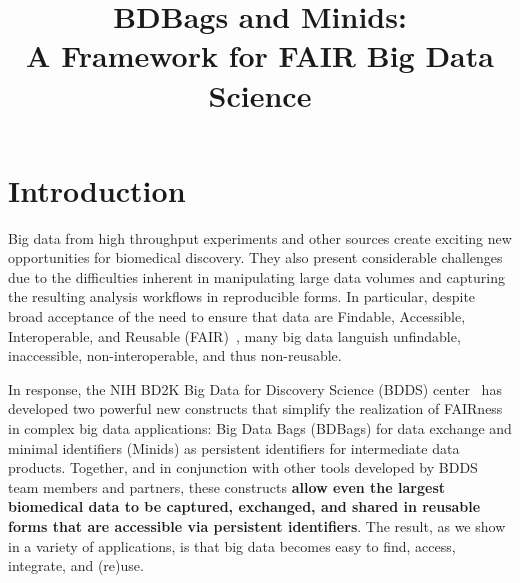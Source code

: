 \documentclass[11pt]{article}
\title{BDBags and Minids:\\A Framework for FAIR Big Data Science}
\author{}
\date{}
\begin{document}
\maketitle


\section{Introduction}

Big data from high throughput experiments and other sources create exciting new opportunities for biomedical discovery. 
They also present considerable challenges %
due to the difficulties inherent in manipulating large data volumes and capturing the resulting analysis workflows in reproducible forms.
In particular, despite broad acceptance of the need to ensure that data are
Findable, Accessible, Interoperable, and Reusable (FAIR)~\cite{wilkinson16},
many big data languish unfindable, inaccessible, non-interoperable, and thus non-reusable.

In response, the NIH BD2K Big Data for Discovery Science (BDDS) center~\cite{toga15}
has developed two powerful new constructs that simplify the realization of FAIRness in 
complex big data applications: Big Data Bags (BDBags) for data exchange and 
minimal identifiers (Minids) as persistent identifiers for intermediate data products.
Together, and in conjunction with other tools developed by BDDS team members and partners,
these constructs \textbf{allow even the largest biomedical data to be captured, exchanged, and shared 
in reusable forms that are accessible via persistent identifiers}. 
The result, as we show in a variety of applications, is that big data becomes easy to find, access, integrate, and (re)use. 

\vspace{2ex}
\end{document}
